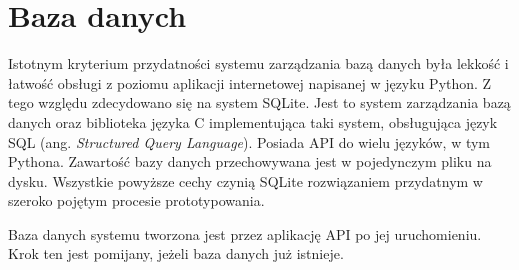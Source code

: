     \section{Baza danych}
    \label{s:db}

    	Istotnym kryterium przydatności systemu zarządzania bazą danych była lekkość i łatwość obsługi z poziomu aplikacji internetowej napisanej w języku Python. Z tego względu zdecydowano się na system SQLite. Jest to system zarządzania bazą danych oraz biblioteka języka C implementująca taki system, obsługująca język SQL (ang. \textit{Structured Query Language}). Posiada API do wielu języków, w tym Pythona. Zawartość bazy danych przechowywana jest w pojedynczym pliku na dysku. Wszystkie powyższe cechy czynią SQLite rozwiązaniem przydatnym w szeroko pojętym procesie prototypowania.

    	Baza danych systemu tworzona jest przez aplikację API po jej uruchomieniu. Krok ten jest pomijany, jeżeli baza danych już istnieje.
